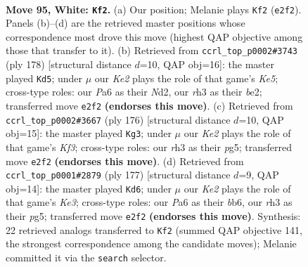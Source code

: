 \documentclass[11pt]{article}
\begin{document}
\clearpage

\begin{figure}[p]\centering
\begin{subfigure}{0.46\textwidth}\centering
\resizebox{\linewidth}{!}{%
\newchessgame
\chessboard[
  setfen={8/4k3/PR2n3/8/8/7r/4K3/8 w - - 17 95},
  showmover=false,
  pgfstyle=straightmove, color=movearrow, markmove={e2-f2}
]}
\caption{}
\end{subfigure}\hfill
\begin{subfigure}{0.46\textwidth}\centering
\resizebox{\linewidth}{!}{%
\newchessgame
\chessboard[
  setfen={8/n7/1k6/4K3/8/8/R2Nb3/8 w - - 41 90},
  showmover=false,
  pgfstyle=straightmove, color=movearrow, markmove={e5-d5}
]}
\caption{}
\end{subfigure}
\\[4pt]
\begin{subfigure}{0.46\textwidth}\centering
\resizebox{\linewidth}{!}{%
\newchessgame
\chessboard[
  setfen={3R4/8/3nk3/6p1/6P1/5K2/8/8 w - - 35 89},
  showmover=false,
  pgfstyle=straightmove, color=movearrow, markmove={f3-g3}
]}
\caption{}
\end{subfigure}\hfill
\begin{subfigure}{0.46\textwidth}\centering
\resizebox{\linewidth}{!}{%
\newchessgame
\chessboard[
  setfen={8/8/1B2k3/6P1/2r4N/6K1/8/8 b - - 8 89},
  showmover=false,
  pgfstyle=straightmove, color=movearrow, markmove={e6-d6}
]}
\caption{}
\end{subfigure}
\caption{\textbf{Move 95, White: \texttt{Kf2}.} (a) Our position; Melanie plays \texttt{Kf2} (\texttt{e2f2}). Panels (b)--(d) are the retrieved master positions whose correspondence most drove this move (highest QAP objective among those that transfer to it). (b) Retrieved from \texttt{ccrl\_top\_p0002\#3743} (ply 178) [structural distance $d$=10, QAP obj=16]: the master played \texttt{Kd5}; under $\mu$ our \emph{Ke2} plays the role of that game's \emph{Ke5}; cross-type roles: our \emph{P}a6 as their \emph{N}d2, our \emph{r}h3 as their \emph{b}e2; transferred move \texttt{e2f2} \textbf{(endorses this move)}. (c) Retrieved from \texttt{ccrl\_top\_p0002\#3667} (ply 176) [structural distance $d$=10, QAP obj=15]: the master played \texttt{Kg3}; under $\mu$ our \emph{Ke2} plays the role of that game's \emph{Kf3}; cross-type roles: our \emph{r}h3 as their \emph{p}g5; transferred move \texttt{e2f2} \textbf{(endorses this move)}. (d) Retrieved from \texttt{ccrl\_top\_p0001\#2879} (ply 177) [structural distance $d$=9, QAP obj=14]: the master played \texttt{Kd6}; under $\mu$ our \emph{Ke2} plays the role of that game's \emph{Ke3}; cross-type roles: our \emph{P}a6 as their \emph{b}b6, our \emph{r}h3 as their \emph{p}g5; transferred move \texttt{e2f2} \textbf{(endorses this move)}. Synthesis: 22 retrieved analogs transferred to \texttt{Kf2} (summed QAP objective 141, the strongest correspondence among the candidate moves); Melanie committed it via the \texttt{search} selector.}
\label{fig:thought-m188}
\end{figure}
\end{document}
